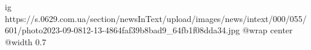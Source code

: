  
 
 
 
 

\ifcmt
  ig https://s.0629.com.ua/section/newsInText/upload/images/news/intext/000/055/601/photo2023-09-0812-13-4864faf39b8bad9_64fb1f08dda34.jpg
  @wrap center
  @width 0.7
\fi
